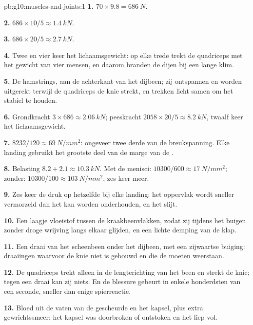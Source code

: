 \begin{solution}{pb:g10:muscles-and-joints:1}
\textbf{1.} $70 \times 9.8 = \qty{686}{N}$.

\textbf{2.} $686 \times 10/5 \approx \qty{1.4}{kN}$.

\textbf{3.} $686 \times 20/5 \approx \qty{2.7}{kN}$.

\textbf{4.} Twee en vier keer het lichaamsgewicht: op elke trede trekt de
quadriceps met het gewicht van vier mensen, en daarom branden de dijen
bij een lange klim.

\textbf{5.} De hamstrings, aan de achterkant van het dijbeen; zij
ontspannen en worden uitgerekt terwijl de quadriceps de knie strekt, en
trekken licht samen om het  stabiel te houden.

\textbf{6.} Grondkracht $3 \times 686 \approx \qty{2.06}{kN}$;
peeskracht $2058 \times 20/5 \approx \qty{8.2}{kN}$, twaalf keer het
lichaamsgewicht.

\textbf{7.} $8232/120 \approx \qty{69}{N/mm^2}$: ongeveer twee derde van
de breukspanning. Elke landing gebruikt het grootste deel van de marge
van de .

\textbf{8.} Belasting $8.2 + 2.1 \approx \qty{10.3}{kN}$. Met de menisci:
$10300/600 \approx \qty{17}{N/mm^2}$; zonder: $10300/100 \approx
\qty{103}{N/mm^2}$, zes keer meer.

\textbf{9.} Zes keer de druk op hetzelfde  bij elke landing: het
oppervlak wordt sneller vermorzeld dan het kan worden onderhouden, en het
slijt.

\textbf{10.} Een laagje vloeistof tussen de kraakbeenvlakken, zodat zij
tijdens het buigen zonder droge wrijving langs elkaar glijden, en een
lichte demping van de klap.

\textbf{11.} Een draai van het scheenbeen onder het dijbeen, met een
zijwaartse buiging: draaiingen waarvoor de knie niet is gebouwd en die de
 moeten weerstaan.

\textbf{12.} De quadriceps trekt alleen in de lengterichting van het
been en strekt de knie; tegen een draai kan zij niets. En de blessure
gebeurt in enkele honderdsten van een seconde, sneller dan enige
spierreactie.

\textbf{13.} Bloed uit de vaten van de gescheurde  en het
kapsel, plus extra gewrichtssmeer: het kapsel was doorbroken of ontstoken
en het  liep vol.


\end{solution}
